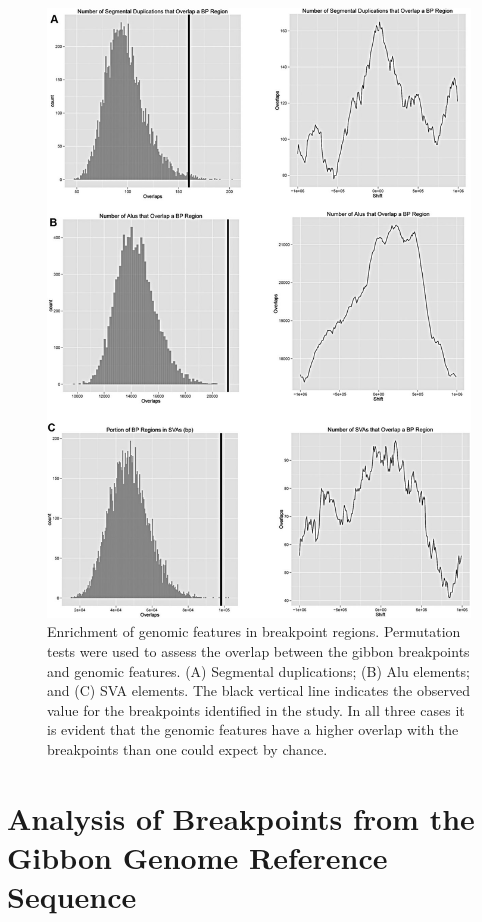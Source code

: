 \begin{figure}
\centering
\includegraphics{figures/gibbon_bac_permutations.jpg}
\caption{Enrichment of genomic features in breakpoint regions. Permutation tests were used to assess the overlap between the gibbon breakpoints and genomic features. (A) Segmental duplications; (B) Alu elements; and (C) SVA elements. The black vertical line indicates the observed value for the breakpoints identified in the study. In all three cases it is evident that the genomic features have a higher overlap with the breakpoints than one could expect by chance.}
\label{gibbon_bac_permutations}

\end{figure}

\section{Analysis of Breakpoints from the Gibbon Genome Reference Sequence}

